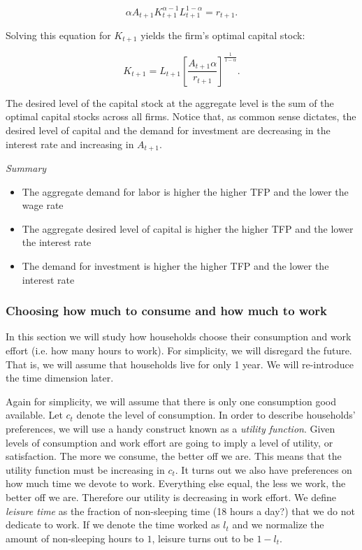 \documentclass[letterpaper,12pt]{article}
\begin{document}
\begin{equation*}
\alpha A_{t+1}K_{t+1}^{\alpha-1}L_{t+1}^{1-\alpha}=r_{t+1}.
\end{equation*}

Solving this equation for $K_{t+1}$ yields the firm's optimal capital stock:

\begin{equation*}
K_{t+1}=L_{t+1}\left[\frac{A_{t+1}\alpha}{r_{t+1}}\right]^{\frac{1}{1-\alpha}}.
\end{equation*}

The desired level of the capital stock at the aggregate level is the sum of the optimal capital
stocks across all firms. Notice that, as common sense dictates, the desired level of capital and
the demand for investment are decreasing in the interest rate and increasing in $A_{t+1}$.

\textit{Summary}

\vspace{-.4cm}

\begin{itemize}

\item The aggregate demand for labor is higher the higher TFP and the lower the wage rate

\item The aggregate desired level of capital is higher the higher TFP and the lower the interest
rate

\item The demand for investment is higher the higher TFP and the lower the interest rate

\end{itemize}

\subsubsection*{Choosing how much to consume and how much to work}\label{sec:work}%
%
In this section we will study how households choose their
consumption and work effort (i.e. how many hours to work). For
simplicity, we will disregard the future. That is, we will assume
that households live for only 1 year. We will re-introduce the
time dimension later.

Again for simplicity, we will assume that there is only one
consumption good available. Let $c_{t}$ denote the level of
consumption. In order to describe households' preferences, we will
use a handy construct known as a \textit{utility function}. Given
levels of consumption and work effort are going to imply a level
of utility, or satisfaction. The more we consume, the better off
we are. This means that the utility function must be increasing in
$c_{t}$. It turns out we also have preferences on how much time we
devote to work. Everything else equal, the less we work, the
better off we are. Therefore our utility is decreasing in work
effort. We define \textit{leisure time} as the fraction of
non-sleeping time (18 hours a day?) that we do not dedicate to
work. If we denote the time worked as $l_{t}$ and we normalize the
amount of non-sleeping hours to $1$, leisure turns out to be
$1-l_{t}$.
\end{document}
